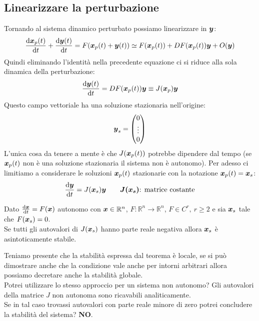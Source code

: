 \subsection{Linearizzare la perturbazione}%
Tornando al sistema dinamico perturbato possiamo linearizzare in $\boldsymbol{y}$:
\[
    \frac{\text{d} \boldsymbol{x}_p(t)}{\text{d} t} + \frac{\text{d} \boldsymbol{y} (t)}{\text{d} t} = 
    F(\boldsymbol{x}_p(t)+ \boldsymbol{y} (t)) \simeq 
    F(\boldsymbol{x}_p(t))+DF(\boldsymbol{x}_p(t))\boldsymbol{y}  + O(\boldsymbol{y})
\] 
Quindi eliminando l'identità nella precedente equazione ci si riduce alla sola dinamica della perturbazione:
\[
    \frac{\text{d} \boldsymbol{y} (t)}{\text{d} t} = DF(\boldsymbol{x}_p(t))\boldsymbol{y}\equiv
    J(\boldsymbol{x}_p)\boldsymbol{y}
\] 
Questo campo vettoriale ha una soluzione stazionaria nell'origine: 
\[
\boldsymbol{y}_s = \begin{pmatrix} 0 \\ \vdots \\ 0 \end{pmatrix}
\] 
L'unica cosa da tenere a mente è che $J(\boldsymbol{x}_p(t))$  potrebbe dipendere dal tempo (se $\boldsymbol{x}_p(t)$ non è una soluzione stazionaria il sistema non è autonomo). Per adesso ci limitiamo a considerare le soluzioni $\boldsymbol{x}_p(t)$  stazionarie con la notazione $\boldsymbol{x}_p(t) = \boldsymbol{x}_s$:
\[
    \frac{\text{d} \boldsymbol{y}}{\text{d} t} = J(\boldsymbol{x}_s)\boldsymbol{y}  \qquad \boldsymbol{J(\boldsymbol{x}_s)}  \text{: matrice costante}
\] 
\begin{thm}
    Dato $\frac{\text{d} \boldsymbol{x}}{\text{d} t} = F(\boldsymbol{x})$ autonomo con $\boldsymbol{x}\in\mathbb{R}^n$, $F:\mathbb{R}^n \to \mathbb{R}^n$, $F \in C^r, \ r\ge 2$ e sia $\boldsymbol{x}_s$ tale che $F(\boldsymbol{x}_s)=0$.\\
    Se tutti gli autovalori di $J(\boldsymbol{x}_s)$ hanno parte reale negativa allora $\boldsymbol{x}_s$ è asintoticamente stabile.
\end{thm}
\noindent
Teniamo presente che la stabilità espressa dal teorema è locale, se si può dimostrare anche che la condizione vale anche per intorni arbitrari allora possiamo decretare anche la stabilità globale.\\
Potrei utilizzare lo stesso approccio per un sistema non autonomo? Gli autovalori della matrice $J$ non autonoma sono ricavabili analiticamente. \\
Se in tal caso trovassi autovalori con parte reale minore di zero potrei concludere la stabilità del sistema? \textbf{NO}.
